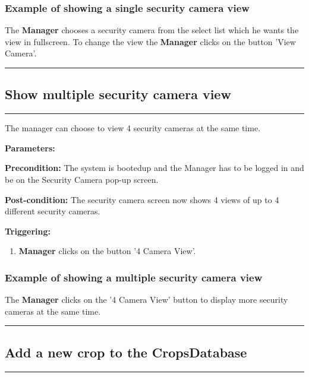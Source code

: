 \subsubsection{Example of showing a single security camera view}
The \textbf{Manager} chooses a security camera from the select list which he wants the view in fullscreen. To change the view  the \textbf{Manager} clicks on the button 'View Camera'.
\hfill
\vspace{0.5cm}
\hrule


\break

\subsection{Show multiple security camera view}
\hrule
\hfill
\vspace{0.5cm}
\label{operation:Show multiple security camera view}

The manager can choose to view 4 security cameras at the same time.

\begin{description}

\item \textbf{Parameters:} 
\item \textbf{Precondition:} The system is bootedup and the Manager has to be
logged in and be on the Security Camera pop-up screen.
\item \textbf{Post-condition:} The security camera screen now shows 4 views of up to 4 different security cameras.
\item \textbf{Triggering:}
\begin{enumerate}

\item \textbf{Manager} clicks on the button '4 Camera View'.

\end{enumerate}
\end{description}

\subsubsection{Example of showing a multiple security camera view}
The \textbf{Manager} clicks on the '4 Camera View' button to display more security cameras at the same time.
\hfill
\vspace{0.5cm}
\hrule




\subsection{Add a new crop to the CropsDatabase}
\hrule
\hfill
\vspace{0.5cm}
\label{operation:Add a new crop the CropsDatabase}


